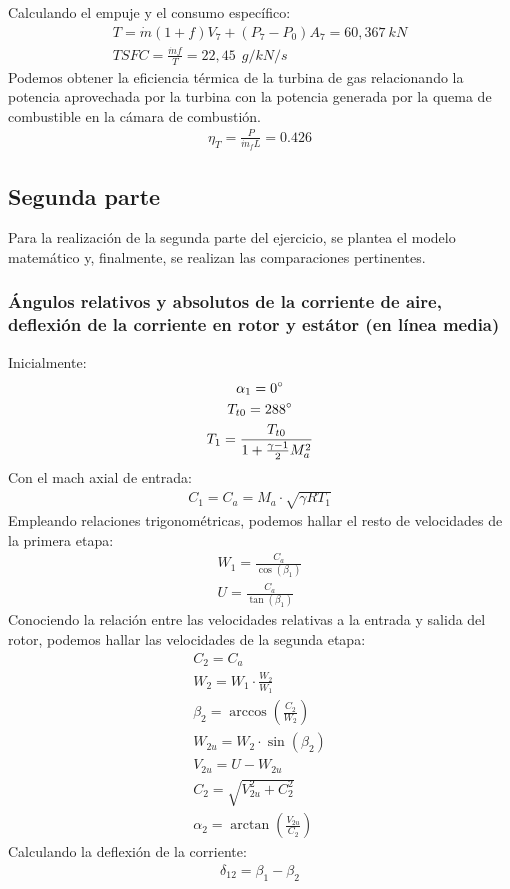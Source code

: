 \documentclass{report}
\begin{document}
Calculando el empuje y el consumo específico:
\begin{gather}
T = \Dot{m} (1+f) V_7 + (P_7-P_0)A_7=60,367\:kN\\
TSFC = \frac{\Dot{m} f}{T}=\boxed{22,45\:\ g/kN/s}
\end{gather}
Podemos obtener la eficiencia térmica de la turbina de gas relacionando la potencia aprovechada por la turbina con la potencia generada por la quema de combustible en la cámara de combustión.
\begin{gather}
\eta_T = \frac{P}{\Dot{m}_f L}=\boxed{0.426}
\end{gather}
\newpage
\subsection{Segunda parte}
Para la realización de la segunda parte del ejercicio, se plantea el modelo matemático y, finalmente, se realizan las comparaciones pertinentes.
\subsubsection{Ángulos relativos y absolutos de la corriente de aire, deflexión de la corriente en rotor y estátor (en línea media)}
Inicialmente:
\begin{gather}
\alpha_1 = 0\degree\\
T_{t0} = 288\degree\\
T_{1} = \frac{T_{t0}}{1+\frac{\gamma-1}{2}M_a^2}
\end{gather}
Con el mach axial de entrada:
\begin{gather}
C_1 = C_a = M_a \cdot \sqrt{\gamma R T_1}
\end{gather}
Empleando relaciones trigonométricas, podemos hallar el resto de velocidades de la primera etapa:
\begin{gather}
W_1 = \frac{C_a}{\cos(\beta_1)}\\
U = \frac{C_a}{\tan(\beta_1)}
\end{gather}
Conociendo la relación entre las velocidades relativas a la entrada y salida del rotor, podemos hallar las velocidades de la segunda etapa:
\begin{gather}
C_2 = C_a\\
W_2 = W_1 \cdot \frac{W_2}{W_1}\\
\beta_2 = \arccos\left(\frac{C_2}{W_2}\right)\\
W_{2u} = W_2 \cdot \sin(\beta_2)\\
V_{2u} = U - W_{2u}\\
C_2 = \sqrt{V_{2u}^2 + C_2^2}\\
\alpha_2 = \arctan\left(\frac{V_{2u}}{C_2}\right)
\end{gather}
Calculando la deflexión de la corriente:
\begin{gather}
\delta_{12} = \beta_1 - \beta_2
\end{gather}
\end{document}

